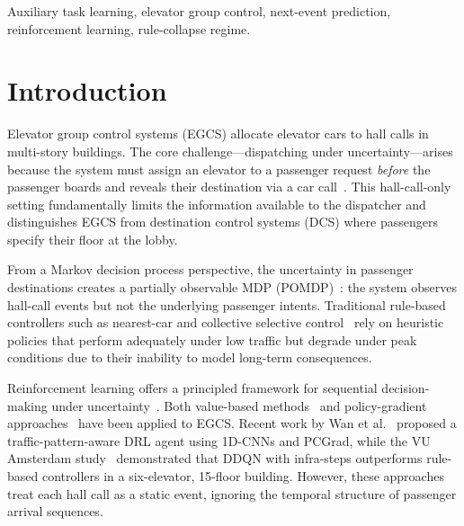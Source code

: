 \documentclass{ieeeaccess}
\begin{document}
\begin{keywords}
Auxiliary task learning, elevator group control, next-event
prediction, reinforcement learning, rule-collapse regime.
\end{keywords}

\titlepgskip=-21pt

\maketitle
\section{Introduction}
\label{sec:introduction}

Elevator group control systems (EGCS) allocate elevator cars to hall
calls in multi-story buildings. The core challenge---dispatching
under uncertainty---arises because the system must assign an elevator
to a passenger request \emph{before} the passenger boards and reveals
their destination via a car call~\cite{barney2003elevator}. This
hall-call-only setting fundamentally limits the information available
to the dispatcher and distinguishes EGCS from destination control
systems (DCS) where passengers specify their floor at the lobby.

From a Markov decision process perspective, the uncertainty in
passenger destinations creates a partially observable MDP
(POMDP)~\cite{sutton2018reinforcement}: the system observes hall-call
events but not the underlying passenger intents. Traditional
rule-based controllers such as nearest-car and collective selective
control~\cite{siikonen1997elevator} rely on heuristic policies that
perform adequately under low traffic but degrade under peak
conditions due to their inability to model long-term consequences.

Reinforcement learning offers a principled framework for sequential
decision-making under uncertainty~\cite{sutton2018reinforcement}.
Both value-based methods~\cite{mnih2015dqn,crites1998elevator} and
policy-gradient approaches~\cite{schulman2017ppo} have been applied
to EGCS. Recent work by Wan et al.~\cite{wan2024traffic} proposed a
traffic-pattern-aware DRL agent using 1D-CNNs and PCGrad, while the
VU Amsterdam study~\cite{vu2025rl} demonstrated that DDQN with
infra-steps outperforms rule-based controllers in a six-elevator,
15-floor building. However, these approaches treat each hall call as
a static event, ignoring the temporal structure of passenger arrival
sequences.
\end{document}
